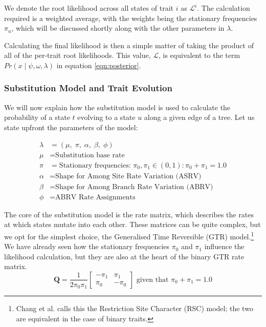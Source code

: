 \documentclass[10pt,journal,compsoc]{IEEEtran}
\begin{document}
We denote the root likelihood across all states of trait $i$ as $\mathcal{L}^{i}$. The calculation required is a weighted average, with the weights being the stationary frequencies $\pi_u$, which will be discussed shortly along with the other parameters in $\lambda$.

Calculating the final likelihood is then a simple matter of taking the product of all of the per-trait root likelihoods. This value, $\mathcal{L}$, is equivalent to the term $Pr(x\;|\;\psi, \omega, \lambda)$ in equation \eqref{eqn:posterior}.

\subsubsection{Substitution Model and Trait Evolution}

We will now explain how the substitution model is used to calculate the probability of a state $t$ evolving to a state $u$ along a given edge of a tree. Let us state upfront the parameters of the model:

\begin{align*}
    \lambda &= (\mu,\;\pi,\;\alpha,\;\beta,\;\phi)\\
    \mu &= \text{Substitution base rate}\\
    \pi &= \text{Stationary frequencies: } \pi_0, \pi_1 \in \left(0, 1\right) : \pi_0 + \pi_1 = 1.0\\
    \alpha &= \text{Shape for Among Site Rate Variation (ASRV)}\\
    \beta &= \text{Shape for Among Branch Rate Variation (ABRV)}\\
    \phi &= \text{ABRV Rate Assignments}
\end{align*}

The core of the substitution model is the rate matrix, which describes the rates at which states mutate into each other. These matrices can be quite complex, but we opt for the simplest choice, the Generalised Time Reversible (GTR) model.\footnote{Chang et al. calls this the Restriction Site Character (RSC) model; the two are equivalent in the case of binary traits.} We have already seen how the stationary frequencies $\pi_0$ and $\pi_1$ influence the likelihood calculation, but they are also at the heart of the binary GTR rate matrix. 
\begin{equation}\label{eqn:ratematrix}
\textbf{Q} = \frac{1}{2\pi_0\pi_1} \begin{bmatrix}
-\pi_1 & \pi_1\\
\pi_0 & -\pi_0
\end{bmatrix} \text{ \ given that \ } \pi_0 + \pi_1 = 1.0
\end{equation}
\end{document}
